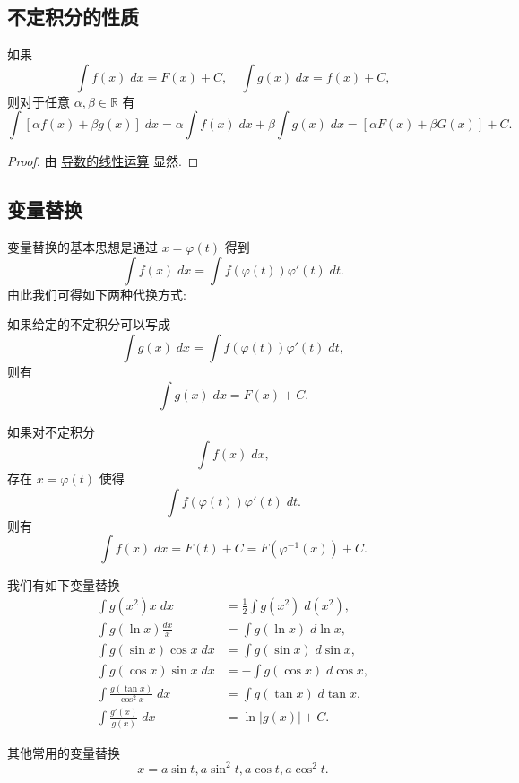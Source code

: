\documentclass[cn,toc=twocol]{elegantbook}
\newcommand{\R}{\mathbb{R}}
\begin{document}
\subsection{不定积分的性质}

\begin{theorem}
	如果
	\[
		\int f(x) \; dx = F(x) + C,\quad \int g(x) \; dx = f(x) + C,
	\]
	则对于任意 $\alpha,\beta\in\R$ 有
	\[
		\int [\alpha f(x) + \beta g(x)] \; dx = \alpha \int f(x) \; dx + \beta \int g(x) \; dx = [\alpha F(x) + \beta G(x)] + C.
	\]
\end{theorem}
\begin{proof}
	由 \hyperref[thm:dp1]{导数的线性运算} 显然.
\end{proof}


\subsection{变量替换}

变量替换的基本思想是通过 $x = \varphi(t)$ 得到
\[
	\int f(x) \; dx = \int f(\varphi(t))\varphi'(t) \; dt.
\]
由此我们可得如下两种代换方式:

如果给定的不定积分可以写成
\[
	\int g(x) \; dx = \int f(\varphi(t))\varphi'(t) \; dt,
\]
则有
\[
	\int g(x) \; dx = F(x) + C.
\]

如果对不定积分
\[
	\int f(x)\;  dx,
\]
存在 $x = \varphi(t)$ 使得
\[
	\int f(\varphi(t))\varphi'(t)\; dt.
\]
则有
\[
	\int f(x) \; dx = F(t) + C = F(\varphi^{-1}(x)) + C.
\]

\vspace{0.5em}


\begin{example}
	我们有如下变量替换
	\[
		\begin{aligned}
			\int g(x^2) x \; dx &= \frac12\int g(x^2) \; d(x^2),\\
			\int g(\ln x) \frac{dx}{x} &= \int g(\ln x) \; d \ln x,\\
			\int g(\sin x) \cos x \; dx &= \int g(\sin x) \; d\sin x,\\
			\int g(\cos x) \sin x \; dx &= - \int g(\cos x) \; d\cos x,\\
			\int \frac{g(\tan x)}{\cos^2 x} \; dx &= \int g(\tan x) \; d \tan x,\\
			\int \frac{g'(x)}{g(x)} \; dx &= \ln \lvert g(x) \rvert + C.
		\end{aligned}
	\]
\end{example}
\vspace{0.5em}

\begin{example}
	其他常用的变量替换
	\[
		x = a\sin t, a\sin^2 t, a\cos t, a\cos^2 t.
	\]	
\end{example}
\vspace{0.5em}
\end{document}
